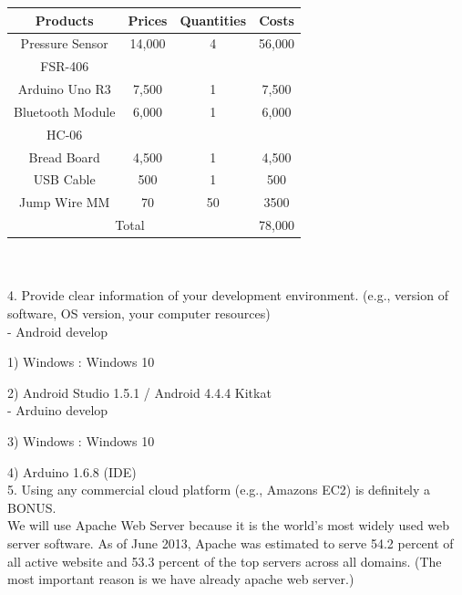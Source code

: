 \documentclass[conference]{IEEEtran}
\begin{document}
\begin{tabular}{|c|c|c|c|}\hline


Products & Prices & Quantities & Costs \\ \hline \hline

Pressure Sensor & 14,000 & 4 & 56,000  \\

FSR-406 &  & & \\ \hline 

Arduino Uno R3 & 7,500 & 1 & 7,500 \\ \hline

Bluetooth Module & 6,000 & 1  & 6,000 \\

HC-06 & & &\\  \hline

Bread Board & 4,500 & 1 & 4,500 \\\hline

USB Cable & 500 & 1 & 500  \\ \hline

Jump Wire MM& 70 & 50 & 3500  \\ \hline

\multicolumn{3}{|c|}{Total} & \multicolumn{1}{|l|}{78,000} \\ \hline 

\end{tabular} \\\\


4.	Provide clear information of your development environment. (e.g., version of software, OS version, your computer resources)\\

-	Android develop

1)	Windows : Windows 10

2)	Android Studio 1.5.1 / Android 4.4.4 Kitkat\\

-	Arduino develop 

3)	Windows : Windows 10

4)	Arduino 1.6.8 (IDE)\\


5.	Using any commercial cloud platform (e.g., Amazons EC2) is definitely a BONUS.\\

 We will use Apache Web Server because it is the world's most widely used web server software. As of June 2013, Apache was estimated to serve 54.2 percent of all active website and 53.3 percent of the top servers across all domains. (The most important reason is we have already apache web server.)\\
\end{document}
